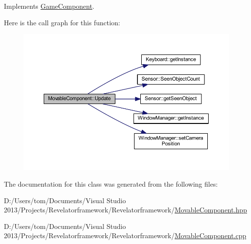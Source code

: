 Implements \hyperlink{class_game_component_af4ff61bad044ac587cf2f066d5b4afa0}{Game\-Component}.



Here is the call graph for this function\-:\nopagebreak
\begin{figure}[H]
\begin{center}
\leavevmode
\includegraphics[width=350pt]{class_movable_component_affdc7dddf2207eda3e8a00136adf56ee_cgraph}
\end{center}
\end{figure}




The documentation for this class was generated from the following files\-:\begin{DoxyCompactItemize}
\item 
D\-:/\-Users/tom/\-Documents/\-Visual Studio 2013/\-Projects/\-Revelatorframework/\-Revelatorframework/\hyperlink{_movable_component_8hpp}{Movable\-Component.\-hpp}\item 
D\-:/\-Users/tom/\-Documents/\-Visual Studio 2013/\-Projects/\-Revelatorframework/\-Revelatorframework/\hyperlink{_movable_component_8cpp}{Movable\-Component.\-cpp}\end{DoxyCompactItemize}
